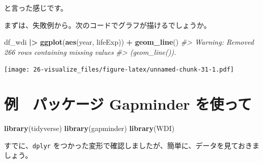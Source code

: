 \documentclass[
  xelatex, ja=standard]{bxjsbook}
\newenvironment{Shaded}{\begin{snugshade}}{\end{snugshade}}
\newcommand{\CommentTok}[1]{\textcolor[rgb]{0.56,0.35,0.01}{\textit{#1}}}
\newcommand{\FunctionTok}[1]{\textcolor[rgb]{0.13,0.29,0.53}{\textbf{#1}}}
\newcommand{\NormalTok}[1]{#1}
\newcommand{\SpecialCharTok}[1]{\textcolor[rgb]{0.81,0.36,0.00}{\textbf{#1}}}
\theoremstyle{definition}
\theoremstyle{definition}
\theoremstyle{definition}
\theoremstyle{definition}
\theoremstyle{remark}
\begin{document}
と言った感じです。

まずは、失敗例から。次のコードでグラフが描けるでしょうか。

\begin{Shaded}
\begin{Highlighting}[]
\NormalTok{df\_wdi }\SpecialCharTok{|\textgreater{}} \FunctionTok{ggplot}\NormalTok{(}\FunctionTok{aes}\NormalTok{(year, lifeExp)) }\SpecialCharTok{+} \FunctionTok{geom\_line}\NormalTok{()}
\CommentTok{\#\textgreater{} Warning: Removed 266 rows containing missing values}
\CommentTok{\#\textgreater{} (\textasciigrave{}geom\_line()\textasciigrave{}).}
\end{Highlighting}
\end{Shaded}

\texttt{[image: 26-visualize\_files/figure-latex/unnamed-chunk-31-1.pdf]}

\hypertarget{ux4f8b-ux30d1ux30c3ux30b1ux30fcux30b8-gapminder-ux3092ux4f7fux3063ux3066}{%
\section{例　パッケージ Gapminder を使って}\label{ux4f8b-ux30d1ux30c3ux30b1ux30fcux30b8-gapminder-ux3092ux4f7fux3063ux3066}}

\begin{Shaded}
\begin{Highlighting}[]
\FunctionTok{library}\NormalTok{(tidyverse)}
\FunctionTok{library}\NormalTok{(gapminder)}
\FunctionTok{library}\NormalTok{(WDI)}
\end{Highlighting}
\end{Shaded}

すでに、\texttt{dplyr} をつかった変形で確認しましたが、簡単に、データを見ておきましょう。
\end{document}
